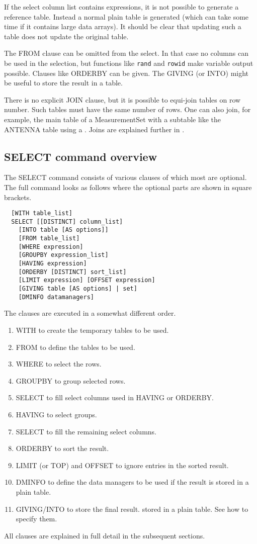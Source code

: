 If the select column list contains expressions, it is not possible to
generate a reference table. Instead a normal plain table is generated
(which can take some time if it contains large data arrays).
It should be clear that updating such a table does not update the
original table.

The FROM clause can be omitted from the select. In that case
no columns can be used in the selection, but functions like {\tt rand}
and {\tt rowid} make variable output possible. Clauses
like ORDERBY can be given. The GIVING (or
INTO) might be useful to store the result in a table.

There is no explicit JOIN clause, but it is possible to
equi-join tables on row number.
Such tables must have the same number of rows.
One can also join, for example, the main table of a
MeasurementSet with a subtable like the ANTENNA table using a
.
Joins are explained further in
.

\subsection{\label{TAQL:SELECT}SELECT command overview}
The SELECT command consists of various clauses of which most are
optional. The full command looks as follows where the optional
parts are shown in square brackets.
\begin{verbatim}
  [WITH table_list]
  SELECT [[DISTINCT] column_list]
    [INTO table [AS options]]
    [FROM table_list]
    [WHERE expression]
    [GROUPBY expression_list]
    [HAVING expression]
    [ORDERBY [DISTINCT] sort_list]
    [LIMIT expression] [OFFSET expression]
    [GIVING table [AS options] | set]
    [DMINFO datamanagers]
\end{verbatim}
The clauses are executed in a somewhat different order.
\begin{enumerate}
\item WITH to create the temporary tables to be used.
\item FROM to define the tables to be used.
\item WHERE to select the rows.
\item GROUPBY to group selected rows.
\item SELECT to fill select columns used in HAVING or ORDERBY.
\item HAVING to select groups.
\item SELECT to fill the remaining select columns.
\item ORDERBY to sort the result.
\item LIMIT (or TOP) and OFFSET to ignore entries in the sorted result.
\item DMINFO to define the data managers to be used if the result is
  stored in a plain table.
\item GIVING/INTO to store the final result.
  stored in a plain table. See
  how to specify them.
\end{enumerate}
All clauses are explained in full detail in the subsequent sections.

